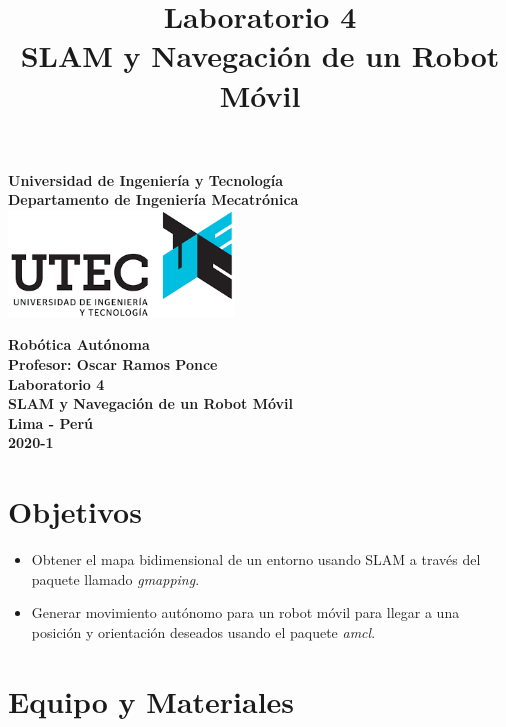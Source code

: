 \documentclass[a4paper,11pt]{robotlabs}
\title{
  \textbf{Laboratorio 4 \\ SLAM y Navegación de un Robot Móvil}
  \date{}
}
\begin{document}

\thispagestyle{empty}
\begin{center}
\textbf{{\huge Universidad de Ingenier\'ia y Tecnolog\'ia}\\ [.5cm]
 {\LARGE Departamento de Ingenier\'ia  Mecatr\'onica}\\[3cm]
}
{\includegraphics[width=6cm]{images/utec}}\\[3cm]
\end{center}

\begin{center}
  {\LARGE \textbf{Robótica Autónoma}}\\[0.8cm]
  {\Large \textbf{Profesor: Oscar Ramos Ponce}}\\[3.0cm]
  {\Large \textbf{Laboratorio 4}}\\[0.5cm]
  {\Large \textbf{SLAM y Navegación de un Robot Móvil}}\\[4.8cm] %
  {\Large \textbf{Lima - Perú}} \\[0.5cm]
  {\LARGE \textbf{2020-1}}
\end{center}

\newpage
\maketitle
\thispagestyle{fancyplain}

\section{Objetivos}

\begin{itemize}
\item Obtener el mapa bidimensional de un entorno usando SLAM a través del
  paquete llamado \textit{gmapping}.
\item Generar movimiento autónomo para un robot móvil para llegar a una
  posición y orientación deseados usando el paquete \textit{amcl}.
\end{itemize}

\section{Equipo y Materiales}
\end{document}
